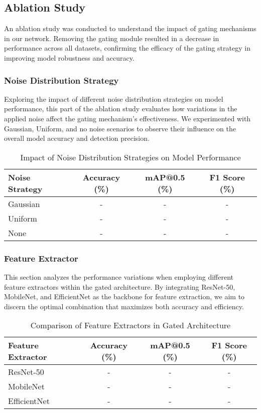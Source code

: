 \subsection{Ablation Study}

An ablation study was conducted to understand the impact of gating mechanisms in our network. Removing the gating module resulted in a decrease in performance across all datasets, confirming the efficacy of the gating strategy in improving model robustness and accuracy.

\subsubsection{Noise Distribution Strategy}

Exploring the impact of different noise distribution strategies on model performance, this part of the ablation study evaluates how variations in the applied noise affect the gating mechanism's effectiveness. We experimented with Gaussian, Uniform, and no noise scenarios to observe their influence on the overall model accuracy and detection precision.

\begin{table}[ht]
\centering
\caption{Impact of Noise Distribution Strategies on Model Performance}
\label{tab:noise_distribution}
\begin{tabular}{@{}lccc@{}}
\toprule
Noise Strategy & Accuracy (\%) & mAP@0.5 (\%) & F1 Score (\%) \\ 
\midrule
Gaussian & - & - & - \\
Uniform & - & - & - \\
None & - & - & - \\
\bottomrule
\end{tabular}
\end{table}

\subsubsection{Feature Extractor}

This section analyzes the performance variations when employing different feature extractors within the gated architecture. By integrating ResNet-50, MobileNet, and EfficientNet as the backbone for feature extraction, we aim to discern the optimal combination that maximizes both accuracy and efficiency.

\begin{table}[ht]
\centering
\caption{Comparison of Feature Extractors in Gated Architecture}
\label{tab:feature_extractor}
\begin{tabular}{@{}lccc@{}}
\toprule
Feature Extractor & Accuracy (\%) & mAP@0.5 (\%) & F1 Score (\%) \\ 
\midrule
ResNet-50 & - & - & - \\
MobileNet & - & - & - \\
EfficientNet & - & - & - \\
\bottomrule
\end{tabular}
\end{table}

